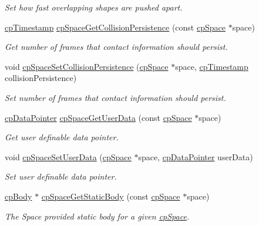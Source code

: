 \begin{DoxyCompactItemize}
\begin{DoxyCompactList}\small\item\em Set how fast overlapping shapes are pushed apart. \end{DoxyCompactList}\item 
\hyperlink{group__basic_types_gaa24652c104082d0725066ea5ac7dc83f}{cp\+Timestamp} \hyperlink{group__cp_space_gafabc09ef5a4a03c623092d6b4b50e524}{cp\+Space\+Get\+Collision\+Persistence} (const \hyperlink{structcp_space}{cp\+Space} $\ast$space)
\begin{DoxyCompactList}\small\item\em Get number of frames that contact information should persist. \end{DoxyCompactList}\item 
void \hyperlink{group__cp_space_gae892594e3051b0ccb4f932d15d9c986f}{cp\+Space\+Set\+Collision\+Persistence} (\hyperlink{structcp_space}{cp\+Space} $\ast$space, \hyperlink{group__basic_types_gaa24652c104082d0725066ea5ac7dc83f}{cp\+Timestamp} collision\+Persistence)
\begin{DoxyCompactList}\small\item\em Set number of frames that contact information should persist. \end{DoxyCompactList}\item 
\hyperlink{group__basic_types_ga2ac2c3c31e21893941f9e4f8ee279447}{cp\+Data\+Pointer} \hyperlink{group__cp_space_ga3b33b522787f17742557672591fb5658}{cp\+Space\+Get\+User\+Data} (const \hyperlink{structcp_space}{cp\+Space} $\ast$space)
\begin{DoxyCompactList}\small\item\em Get user definable data pointer. \end{DoxyCompactList}\item 
void \hyperlink{group__cp_space_ga7d887eb6a99605433c6ab65ede689835}{cp\+Space\+Set\+User\+Data} (\hyperlink{structcp_space}{cp\+Space} $\ast$space, \hyperlink{group__basic_types_ga2ac2c3c31e21893941f9e4f8ee279447}{cp\+Data\+Pointer} user\+Data)
\begin{DoxyCompactList}\small\item\em Set user definable data pointer. \end{DoxyCompactList}\item 
\hyperlink{structcp_body}{cp\+Body} $\ast$ \hyperlink{group__cp_space_ga170502383e9e56e1e34ad87ed35babea}{cp\+Space\+Get\+Static\+Body} (const \hyperlink{structcp_space}{cp\+Space} $\ast$space)
\begin{DoxyCompactList}\small\item\em The Space provided static body for a given \hyperlink{structcp_space}{cp\+Space}. \end{DoxyCompactList}\item 

\end{DoxyCompactItemize}
